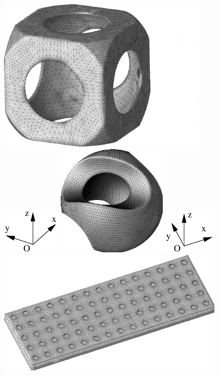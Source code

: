 \documentclass[oneside,onecolumn,10pt,final]{asme2ej}
\newcounter{tema}
\begin{document}
\begin{figure}[tb]
 {%
  \centerline{%
   \includegraphics[width=4.6truecm]{./FIG/chueco-9824-b-bw}
   \hspace{0pt}%
   \includegraphics[width=0.8truecm]{./FIG/elemental-simetria-3}
   \hspace{4pt}%
   \includegraphics[width=3.4truecm]{./FIG/sculpt-012k}
   \hspace{16pt}%
   \includegraphics[width=0.8truecm]{./FIG/elemental-simetria-4}
   \hspace{2pt}%
   \includegraphics[width=6.2truecm]{./FIG/ra75-17686-dg-ta-bw-2}
}}
\end{figure}
\end{document}
